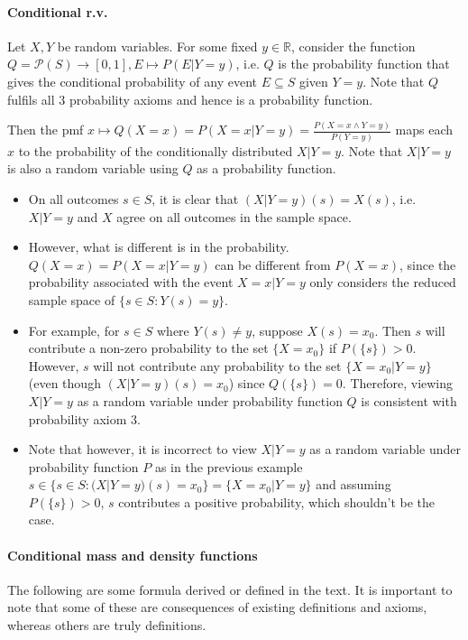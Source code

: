 \documentclass{article}
\begin{document}
\paragraph{Conditional r.v.} Let $X, Y$ be random variables. For some fixed $y\in \mathbb{R}$, consider the function $Q = \mathcal{P}(S)\rightarrow [0,1], E\mapsto P(E | Y=y)$, i.e. $Q$ is the probability function that gives the conditional probability of any event $E\subseteq S$ given $Y=y$. Note that $Q$ fulfils all 3 probability axioms and hence is a probability function.

Then the pmf $x\mapsto Q(X=x) = P(X=x | Y=y) = \frac{P(X=x\land Y=y)}{P(Y=y)}$ maps each $x$ to the probability of the conditionally distributed $X|Y=y$. Note that $X|Y=y$ is also a random variable using $Q$ as a probability function.

\begin{itemize}
	\item On all outcomes $s\in S$, it is clear that $(X|Y=y)(s) = X(s)$, i.e. $X|Y=y$ and $X$ agree on all outcomes in the sample space.
	\item However, what is different is in the probability. $Q(X=x) = P(X=x|Y=y)$ can be different from $P(X=x)$, since the probability associated with the event $X=x|Y=y$ only considers the reduced sample space of $\{s\in S : Y(s) = y\}$.
	\item For example, for $s\in S$ where $Y(s)\neq y$, suppose $X(s) = x_0$. Then $s$ will contribute a non-zero probability to the set $\{X=x_0\}$ if $P(\{s\}) > 0$. However, $s$ will not contribute any probability to the set $\{X=x_0|Y=y\}$ (even though $(X|Y=y)(s) = x_0$) since $Q(\{s\}) = 0$. Therefore, viewing $X|Y=y$ as a random variable under probability function $Q$ is consistent with probability axiom 3.
	\item Note that however, it is incorrect to view $X|Y=y$ as a random variable under probability function $P$ as in the previous example $s\in \{s\in S : (X|Y=y)(s) = x_0\} = \{X=x_0|Y=y\}$ and assuming $P(\{s\}) > 0$, $s$ contributes a positive probability, which shouldn't be the case.
\end{itemize}

\paragraph{Conditional mass and density functions} The following are some formula derived or defined in the text. It is important to note that some of these are consequences of existing definitions and axioms, whereas others are truly definitions.
\end{document}
